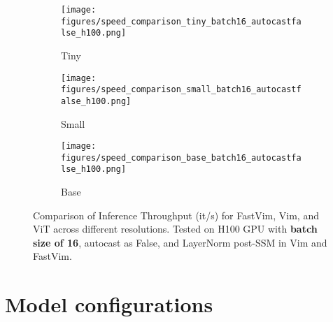 \begin{figure*}[!h]
    \centering
    \begin{subfigure}[b]{0.32\textwidth}
        \centering
        \texttt{[image: figures/speed\_comparison\_tiny\_batch16\_autocastfalse\_h100.png]}
        \caption{Tiny}
    \end{subfigure}
    \begin{subfigure}[b]{0.32\textwidth}
        \centering
        \texttt{[image: figures/speed\_comparison\_small\_batch16\_autocastfalse\_h100.png]}
        \caption{Small}
    \end{subfigure}
    \begin{subfigure}[b]{0.32\textwidth}
        \centering
        \texttt{[image: figures/speed\_comparison\_base\_batch16\_autocastfalse\_h100.png]}
        \caption{Base}
    \end{subfigure}
    \caption{Comparison of Inference Throughput (it/s) for FastVim, Vim, and ViT across different resolutions. Tested on H100 GPU with \textbf{batch size of 16}, autocast as False, and LayerNorm post-SSM in Vim and FastVim.}
    \label{fig:throughput_tiny_small_base}
\end{figure*}



\section{Model configurations}
\label{model_sizes}

\begin{table}[!h]
    \caption{Model configurations for FastVim}
    \begin{center}
\end{center}
    \label{tab:model_sizes}
\end{table}

